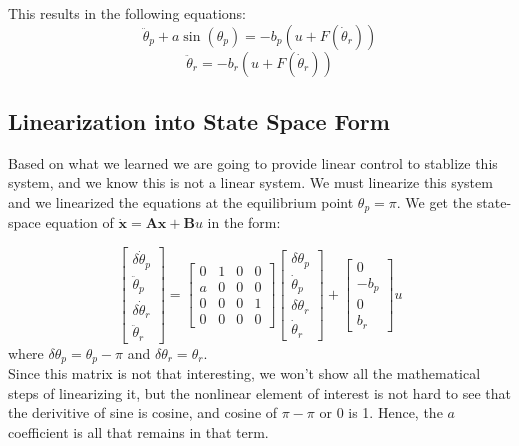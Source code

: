 This results in the following equations:
$$\ddot\theta_p+a\sin(\theta_p)=-b_p(u+F(\dot\theta_r))$$
$$\ddot\theta_r=-b_r(u+F(\dot\theta_r))$$

\subsection{Linearization into State Space Form}

Based on what we learned we are going to provide linear control to stablize this system, and we know this is not a linear system. We must linearize this system and we linearized the equations at the equilibrium point $\theta_p=\pi$. We get the state-space equation of $\boldsymbol{\dot x = Ax+B}u$ in the form:

$$
\begin{bmatrix}
\delta\dot\theta_p\\
\ddot\theta_p\\
\delta\dot\theta_r\\
\ddot\theta_r
\end{bmatrix}
=
\begin{bmatrix}
0 & 1 & 0 & 0\\
a & 0 & 0 & 0\\
0 & 0 & 0 & 1\\
0 & 0 & 0 & 0
\end{bmatrix}
\begin{bmatrix}
\delta\theta_p\\
\dot\theta_p\\
\delta\theta_r\\
\dot\theta_r
\end{bmatrix}
+
\begin{bmatrix}
0\\
-b_p\\
0\\
b_r
\end{bmatrix}
u$$
where $\delta\theta_p = \theta_p-\pi$ and $\delta\theta_r = \theta_r$.\\

Since this matrix is not that interesting, we won't show all the mathematical steps of linearizing it, but the nonlinear element of interest is not hard to see that the derivitive of sine is cosine, and cosine of $\pi - \pi$ or $0$ is 1. Hence, the $a$ coefficient is all that remains in that term.
